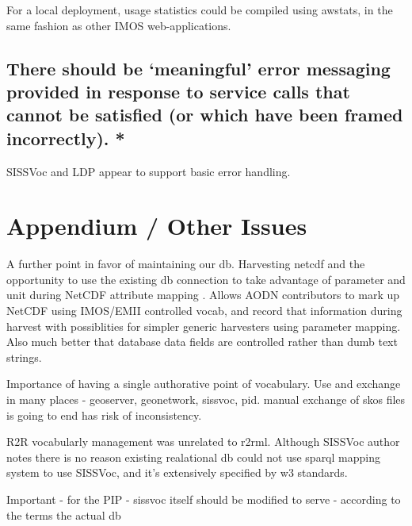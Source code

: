 \documentclass[10pt,a4paper]{article}
\begin{document}
\begin{flushleft}
  \item For a local deployment, usage statistics could be compiled using awstats, in the same fashion as other 
  IMOS web-applications. 



\subsection{ 
There should be ‘meaningful’ error messaging provided in response to
service calls that cannot be satisfied (or which have been framed incorrectly).
* }

  \item SISSVoc and LDP appear to support basic error handling.


\clearpage

\section{ 
  Appendium / Other Issues  }

  \item A further point in favor of maintaining our db. 
  Harvesting netcdf and the opportunity to use the existing db connection to take advantage of parameter and unit during
    NetCDF attribute mapping .  Allows AODN contributors to mark up NetCDF using IMOS/EMII controlled vocab, and record that
  information during harvest with possiblities for simpler generic harvesters using parameter mapping. Also 
  much better that database data fields are controlled rather than dumb text strings. 

 
 \item Importance of having a single authorative point of vocabulary. Use and exchange in many places - geoserver, geonetwork, sissvoc, pid. 
    manual exchange of skos files is going to end has risk of inconsistency. 
 
 \item R2R vocabularly management was unrelated to r2rml. Although SISSVoc author notes there is no reason existing realational db could not use 
  sparql mapping system to use SISSVoc, and it's extensively specified by w3 standards.
   
 \item Important - for the PIP - sissvoc itself should be modified to serve - according to the terms the actual db 




  \end{flushleft}
\end{document}
